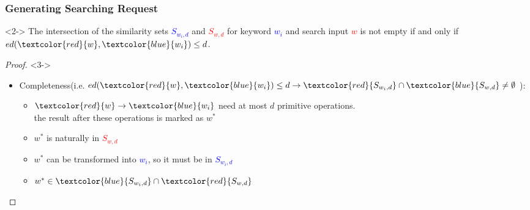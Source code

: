 \documentclass[handout]{beamer}
\begin{document}
\begin{frame}
	\frametitle{Generating Searching Request}
	\begin{theorem}<2->
		The intersection of the similarity sets \textcolor{blue}{${S_{{w_i},d}}$} and \textcolor{red}{${S_{w,d}}$} for keyword \textcolor{blue}{$w_i$} and  search input \textcolor{red}{$w$} is not empty if and only if $ed(\textcolor{red}{w},\textcolor{blue}{w_i}) \le d$.
	\end{theorem}
	
	\begin{proof}<3->
		\begin{itemize}
			\item Completeness(i.e. $ed(\textcolor{red}{w},\textcolor{blue}{w_i}) \le d \to \textcolor{red}{S_{{w_i},d}} \cap \textcolor{blue}{S_{w,d}} \ne \emptyset $ ):
			\begin{itemize}[<4->]
				\item $\textcolor{red}{w} \to \textcolor{blue}{{w_i}}$ need at most $d$ primitive operations.\\the result after these operations is marked as $w^*$
				\item $w^*$ is naturally in \textcolor{red}{${S_{w,d}}$} 
				\item $w^*$ can be transformed into \textcolor{blue}{${w_i}$}, so it must be in \textcolor{blue}{${S_{{w_i},d}}$} 
				\item $w^* \in \textcolor{blue}{S_{{w_i},d}} \cap \textcolor{red}{S_{w,d}}$
			\end{itemize}
		\end{itemize}
	\end{proof}
\end{frame}
\end{document}
